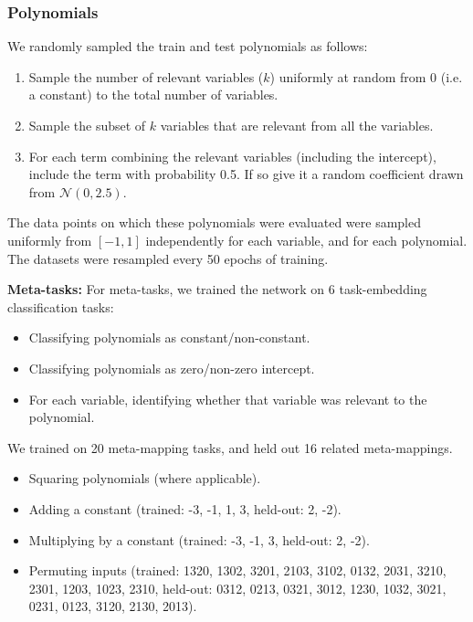 \documentclass{article}
\begin{document}
\subsubsection{Polynomials} \label{meth_data_poly}
We randomly sampled the train and test polynomials as follows:
\begin{enumerate}
\item Sample the number of relevant variables ($k$) uniformly at random from 0 (i.e. a constant) to the total number of variables.
\item Sample the subset of $k$ variables that are relevant from all the variables.
\item For each term combining the relevant variables (including the intercept), include the term with probability 0.5. If so give it a random coefficient drawn from $\mathcal{N}(0, 2.5)$.
\end{enumerate}
The data points on which these polynomials were evaluated were sampled uniformly from $[-1, 1]$ independently for each variable, and for each polynomial. The datasets were resampled every 50 epochs of training. \par
\textbf{Meta-tasks:} For meta-tasks, we trained the network on 6 task-embedding classification tasks:
\begin{itemize}
\item Classifying polynomials as constant/non-constant.
\item Classifying polynomials as zero/non-zero intercept.
\item For each variable, identifying whether that variable was relevant to the polynomial.
\end{itemize}
We trained on 20 meta-mapping tasks, and held out 16 related meta-mappings.
\begin{itemize}
\item Squaring polynomials (where applicable).
\item Adding a constant (trained: -3, -1, 1, 3, held-out: 2, -2).
\item Multiplying by a constant (trained: -3, -1, 3, held-out: 2, -2).
\item Permuting inputs (trained: 1320, 1302, 3201, 2103, 3102, 0132, 2031, 3210, 2301, 1203, 1023, 2310, held-out: 0312, 0213, 0321, 3012, 1230, 1032, 3021, 0231, 0123, 3120, 2130, 2013).
\end{itemize}
\end{document}
